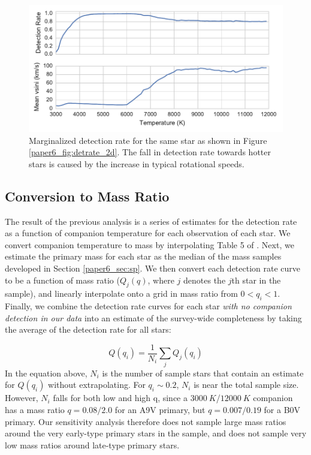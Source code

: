 \begin{figure}
\includegraphics[width=\columnwidth]{Figures/paper6_HIP_24244_20130919_marginalized.pdf}
\caption{Marginalized detection rate for the same star as shown in Figure \ref{paper6_fig:detrate_2d}. The fall in detection rate towards hotter stars is caused by the increase in typical rotational speeds.}
\label{paper6_fig:marginalized}
\end{figure}

\subsection{Conversion to Mass Ratio}

The result of the previous analysis is a series of estimates for the detection rate as a function of companion temperature for each observation of each star. We convert companion temperature to mass by interpolating Table 5 of \citet{Pecaut2013}. Next, we estimate the primary mass for each star as the median of the mass samples developed in Section \ref{paper6_sec:sp}. We then convert each detection rate curve to be a function of mass ratio ($Q_j(q)$, where $j$ denotes the $j$th star in the sample), and linearly interpolate onto a grid in mass ratio from $0 < q_i < 1$. Finally, we combine the detection rate curves for each star \emph{with no companion detection in our data} into an estimate of the survey-wide completeness by taking the average of the detection rate for all stars:

\begin{equation}
Q(q_i) = \frac{1}{N_i} \sum_j Q_j(q_i)
\label{paper6_eqn:completeness}
\end{equation}
In the equation above, $N_i$ is the number of sample stars that contain an estimate for $Q(q_i)$ without extrapolating. For $q_i \sim 0.2$, $N_i$ is near the total sample size. However, $N_i$ falls for both low and high q, since a $3000\ K$/$12000\ K$ companion has a mass ratio $q = 0.08/2.0$ for an A9V primary, but $q = 0.007/0.19$ for a B0V primary. Our sensitivity analysis therefore does not sample large mass ratios around the very early-type primary stars in the sample, and does not sample very low mass ratios around late-type primary stars.


